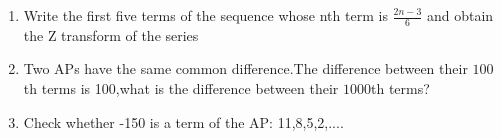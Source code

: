 \begin{enumerate}[label=\thesection.\arabic*,ref=\thesection.\theenumi]
\item Write the first five terms of the sequence whose nth term is $\frac{2n-3}{6}$ and obtain the Z transform of the series\\
\solution

\pagebreak

\item Two APs have the same common difference.The difference between their $100${th} terms is 100,what is the difference between their $1000${th} terms?
\solution

\pagebreak


\item Check whether -150 is a term of the AP: 11,8,5,2,....

 \solution
 


\end{enumerate}
